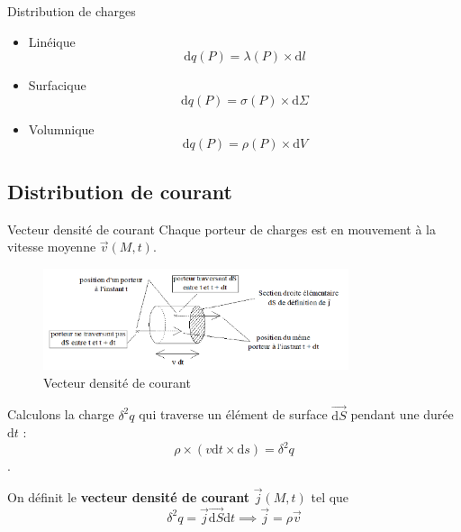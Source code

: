 \begin{Prop}{Distribution de charges}{}

\begin{itemize}

    \item Linéique
      \[
        \mathrm{d}q(P) = \lambda(P) \times \mathrm{d}l
      \]
    \item Surfacique
      \[
        \mathrm{d}q(P ) = \sigma(P) \times \mathrm{d}\Sigma
      \]
    \item Volumnique
      \[
        \mathrm{d}q(P) = \rho(P) \times \mathrm{d}V
      \]
\end{itemize}
\end{Prop}

\subsection{Distribution de courant} %
\label{sub:Distribution de courant}

\begin{Definition}[colbacktitle=red!75!black]{Vecteur densité de courant}{}
Chaque porteur de charges est en mouvement à la vitesse moyenne $\overrightarrow{v }(M,t)$. 

\begin{figure}[H] %
  \centering
  \includegraphics[width=0.8\textwidth]{./assets/Vecteur densité de courant.png}
  \caption{Vecteur densité de courant}
  \label{Vecteur densité de courant}
\end{figure}

Calculons la charge $\delta ^{2} q$ qui traverse un élément de surface $\overrightarrow{\mathrm{d}S}$ pendant une durée $\mathrm{d
}t$ :
\begin{equation}
  \rho \times (v \mathrm{d}t \times \mathrm{d}s) = \delta ^2 q 
\end{equation}.

On définit le \textbf{vecteur densité de courant} $\overrightarrow{j}(M,t)$ tel que 
\[
  \boxed{\delta ^2 q = \overrightarrow{j} \overrightarrow{ \mathrm{d}S} \mathrm{d} t }\implies \overrightarrow{j} = \rho \overrightarrow{v}
\]
\end{Definition}

